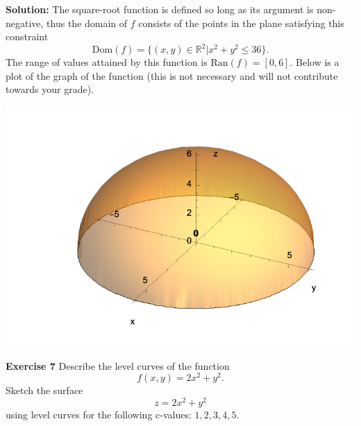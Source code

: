 \documentclass[12pt,oneside]{exam}
\newenvironment{exercise}[1]{\vspace{.1in}\noindent\textbf{Exercise #1 \hspace{.05em}}}{}
\newenvironment{newsolution}{\vspace{.1in}\noindent\textbf{Solution: \hspace{.05em}}}{}
\begin{document}
\begin{newsolution}
The square-root function is defined so long as its argument is non-negative, thus the domain of $f$ consists of the points in the plane satisfying this constraint
\begin{equation*}
\mathrm{Dom}(f) =\{ (x,y) \in \mathbb{R}^2 | x^2+y^2 \leq 36\}.
\end{equation*}
The range of values attained by this function is $\mathrm{Ran}(f) = [0,6]$. Below is a plot of the graph of the function (this is not necessary and will not contribute towards your grade).
\begin{center}
\includegraphics[scale=0.8]{p3.pdf}
\end{center}
\end{newsolution}

\begin{exercise}{7}
Describe the level curves of the function
\begin{equation*}
f(x,y) = 2x^2+y^2.
\end{equation*}
Sketch the surface
\begin{equation*}
z = 2x^2+y^2
\end{equation*}
using level curves for the following c-values: $1, 2, 3, 4, 5$. 
\end{exercise}
\end{document}
